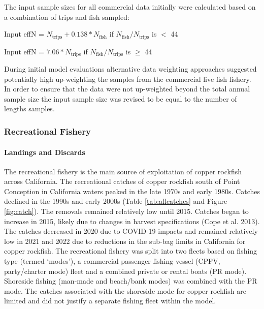 \documentclass[11pt,
  english,
  letterpaper,
]{article}
\begin{document}
The input sample sizes for all commercial data initially were calculated based on a combination of trips and fish sampled:

\begin{centering}

Input effN = $N_{\text{trips}} + 0.138 * N_{\text{fish}}$ if $N_{\text{fish}}/N_{\text{trips}}$ is $<$ 44

Input effN = $7.06 * N_{\text{trips}}$ if $N_{\text{fish}}/N_{\text{trips}}$ is $\geq$ 44

\end{centering}

During initial model evaluations alternative data weighting approaches suggested potentially high up-weighting the samples from the commercial live fish fishery. In order to ensure that the data were not up-weighted beyond the total annual sample size the input sample size was revised to be equal to the number of lengths samples.

\hypertarget{recreational-fishery}{%
\subsubsection{Recreational Fishery}\label{recreational-fishery}}

\hypertarget{landings-and-discards-1}{%
\paragraph{Landings and Discards}\label{landings-and-discards-1}}

\hfill\break

The recreational fishery is the main source of exploitation of copper rockfish across California. The recreational catches of copper rockfish south of Point Conception in California waters peaked in the late 1970s and early 1980s. Catches declined in the 1990s and early 2000s (Table \ref{tab:allcatches} and Figure \ref{fig:catch}). The removals remained relatively low until 2015. Catches began to increase in 2015, likely due to changes in harvest specifications (Cope et al. 2013). The catches decreased in 2020 due to COVID-19 impacts and remained relatively low in 2021 and 2022 due to reductions in the sub-bag limits in California for copper rockfish. The recreational fishery was split into two fleets based on fishing type (termed `modes'), a commercial passenger fishing vessel (CPFV, party/charter mode) fleet and a combined private or rental boats (PR mode). Shoreside fishing (man-made and beach/bank modes) was combined with the PR mode. The catches associated with the shoreside mode for copper rockfish are limited and did not justify a separate fishing fleet within the model.
\end{document}
